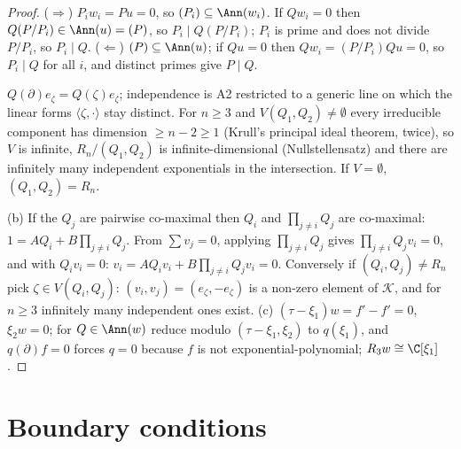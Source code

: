 \begin{proof}
($\Rightarrow$) $P_iw_i=Pu=0$, so $(P_i)\subseteq\Ann(w_i)$. If $Qw_i=0$ then $Q(P/P_i)\in\Ann(u)=(P)$, so $P_i\mid Q(P/P_i)$; $P_i$ is prime and does not divide $P/P_i$, so $P_i\mid Q$. ($\Leftarrow$) $(P)\subseteq\Ann(u)$; if $Qu=0$ then $Qw_i=(P/P_i)Qu=0$, so $P_i\mid Q$ for all $i$, and distinct primes give $P\mid Q$.

$Q(\partial)e_\zeta=Q(\zeta)e_\zeta$; independence is A2 restricted to a generic line on which the linear forms $\langle\zeta,\cdot\rangle$ stay distinct. For $n\ge3$ and $V(Q_1,Q_2)\ne\emptyset$ every irreducible component has dimension $\ge n-2\ge1$ (Krull's principal ideal theorem, twice), so $V$ is infinite, $R_n/(Q_1,Q_2)$ is infinite-dimensional (Nullstellensatz) and there are infinitely many independent exponentials in the intersection. If $V=\emptyset$, $(Q_1,Q_2)=R_n$.

(b) If the $Q_j$ are pairwise co-maximal then $Q_i$ and $\prod_{j\ne i}Q_j$ are co-maximal: $1=AQ_i+B\prod_{j\ne i}Q_j$. From $\sum v_j=0$, applying $\prod_{j\ne i}Q_j$ gives $\prod_{j\ne i}Q_jv_i=0$, and with $Q_iv_i=0$: $v_i=AQ_iv_i+B\prod_{j\ne i}Q_jv_i=0$. Conversely if $(Q_i,Q_j)\ne R_n$ pick $\zeta\in V(Q_i,Q_j)$: $(v_i,v_j)=(e_\zeta,-e_\zeta)$ is a non-zero element of $\mathcal K$, and for $n\ge3$ infinitely many independent ones exist. (c) $(\tau-\xi_1)w=f'-f'=0$, $\xi_2w=0$; for $Q\in\Ann(w)$ reduce modulo $(\tau-\xi_1,\xi_2)$ to $q(\xi_1)$, and $q(\partial)f=0$ forces $q=0$ because $f$ is not exponential-polynomial; $R_3w\cong\C[\xi_1]$.

\end{proof}

\section{Boundary conditions}

